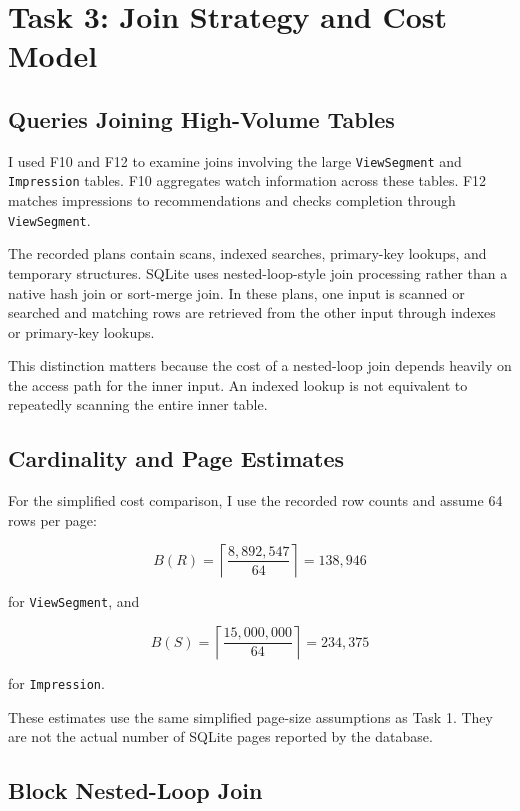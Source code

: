 \documentclass[11pt,a4paper]{article}
\begin{document}
\section{Task 3: Join Strategy and Cost Model}

\subsection{Queries Joining High-Volume Tables}

I used F10 and F12 to examine joins involving the large
\texttt{ViewSegment} and \texttt{Impression} tables. F10 aggregates
watch information across these tables. F12 matches impressions
to recommendations and checks completion through
\texttt{ViewSegment}.

The recorded plans contain scans, indexed searches, primary-key
lookups, and temporary structures. SQLite uses nested-loop-style
join processing rather than a native hash join or sort-merge join.
In these plans, one input is scanned or searched and matching rows
are retrieved from the other input through indexes or primary-key
lookups.

This distinction matters because the cost of a nested-loop join
depends heavily on the access path for the inner input. An indexed
lookup is not equivalent to repeatedly scanning the entire inner
table.

\subsection{Cardinality and Page Estimates}

For the simplified cost comparison, I use the recorded row counts
and assume 64 rows per page:

\[
B(R) =
\left\lceil\frac{8{,}892{,}547}{64}\right\rceil
=138{,}946
\]

for \texttt{ViewSegment}, and

\[
B(S) =
\left\lceil\frac{15{,}000{,}000}{64}\right\rceil
=234{,}375
\]

for \texttt{Impression}.

These estimates use the same simplified page-size assumptions
as Task 1. They are not the actual number of SQLite pages reported
by the database.

\subsection{Block Nested-Loop Join}
\end{document}
